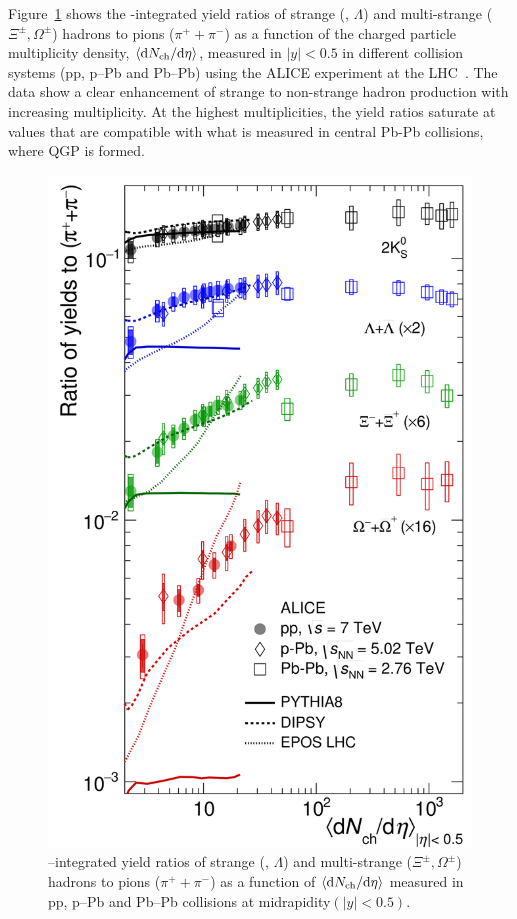 Figure~\ref{fig:StrangenessEnhancement} shows the \pt-integrated yield ratios of strange (\kzs, $\Lambda$) and multi-strange ($\Xi^\pm, \Omega^\pm$) hadrons to pions ($\pi^++\pi^-$) as a function of the charged particle multiplicity density, $\braket{\mathrm{d} N_\mathrm{ch}/\mathrm{d}\eta}$, measured in $\lvert y\rvert<0.5$ in different collision systems (pp, p--Pb and Pb--Pb) using the ALICE experiment at the LHC~\cite{ALICE:2016fzo}. The data show a clear enhancement of strange to non-strange hadron production with increasing multiplicity. At the highest multiplicities, the yield ratios saturate at values that are compatible with what is measured in central Pb-Pb collisions, where QGP is formed.

\begin{figure}[htb!]
  \centering
  \includegraphics[width=0.5\linewidth]{Figures/Chapter 1/StrangenessEnhancement.png}
  \caption{\pt--integrated yield ratios of strange (\kzs, $\Lambda$) and multi-strange ($\Xi^\pm, \Omega^\pm$) hadrons to pions ($\pi^++\pi^-$) as a function of $\braket{\mathrm{d} N_\mathrm{ch}/\mathrm{d}\eta}$ measured in pp, p--Pb and Pb--Pb collisions at midrapidity$(\lvert y\rvert<0.5)$.}
  \label{fig:StrangenessEnhancement}
\end{figure}


